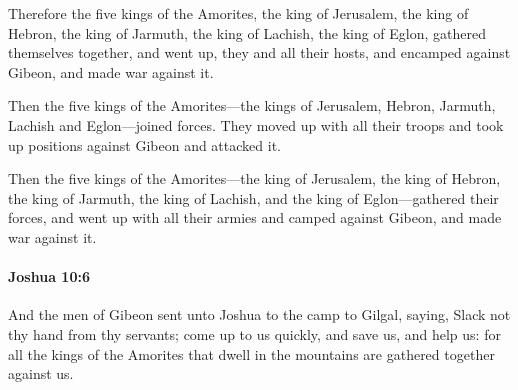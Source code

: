 			\begin{versebox}
					\item[BHS] 
					\item[ASV] Therefore the five kings of the Amorites, the king of Jerusalem, the king of Hebron, the king of Jarmuth, the king of Lachish, the king of Eglon, gathered themselves together, and went up, they and all their hosts, and encamped against Gibeon, and made war against it.
					\item[NIV] Then the five kings of the Amorites—the kings of Jerusalem, Hebron, Jarmuth, Lachish and Eglon—joined forces. They moved up with all their troops and took up positions against Gibeon and attacked it.
					\item[NRSV] Then the five kings of the Amorites—the king of Jerusalem, the king of Hebron, the king of Jarmuth, the king of Lachish, and the king of Eglon—gathered their forces, and went up with all their armies and camped against Gibeon, and made war against it.
			\end{versebox}

		\paragraph{Joshua 10:6} %
			\label{JOSHUA-10-6}

			And the men of Gibeon sent unto Joshua to the camp to Gilgal, saying, Slack not thy hand from thy servants; come up to us quickly, and save us, and help us: for all the kings of the Amorites that dwell in the mountains are gathered together against us.

